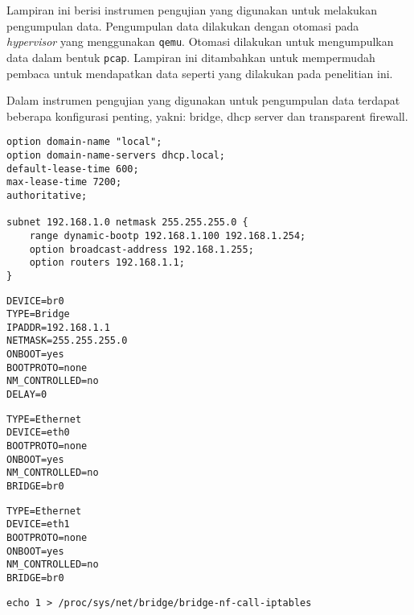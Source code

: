 
Lampiran ini berisi instrumen pengujian yang digunakan untuk melakukan pengumpulan data. Pengumpulan data dilakukan dengan otomasi pada \textit{hypervisor} yang menggunakan \verb|qemu|. Otomasi dilakukan untuk mengumpulkan data dalam bentuk \verb|pcap|. Lampiran ini ditambahkan untuk mempermudah pembaca untuk mendapatkan data seperti yang dilakukan pada penelitian ini.


Dalam instrumen pengujian yang digunakan untuk pengumpulan data terdapat beberapa konfigurasi penting, yakni: bridge, dhcp server dan transparent firewall.


\begin{lstlisting}
option domain-name "local";
option domain-name-servers dhcp.local;
default-lease-time 600;
max-lease-time 7200;
authoritative;

subnet 192.168.1.0 netmask 255.255.255.0 {
	range dynamic-bootp 192.168.1.100 192.168.1.254;
	option broadcast-address 192.168.1.255;
	option routers 192.168.1.1;
}
\end{lstlisting}


\begin{lstlisting}
DEVICE=br0
TYPE=Bridge
IPADDR=192.168.1.1
NETMASK=255.255.255.0
ONBOOT=yes
BOOTPROTO=none
NM_CONTROLLED=no
DELAY=0
\end{lstlisting}


\begin{lstlisting}
TYPE=Ethernet
DEVICE=eth0
BOOTPROTO=none
ONBOOT=yes
NM_CONTROLLED=no
BRIDGE=br0
\end{lstlisting}


\begin{lstlisting}
TYPE=Ethernet
DEVICE=eth1
BOOTPROTO=none
ONBOOT=yes
NM_CONTROLLED=no
BRIDGE=br0
\end{lstlisting}


\begin{lstlisting}
echo 1 > /proc/sys/net/bridge/bridge-nf-call-iptables
\end{lstlisting}

